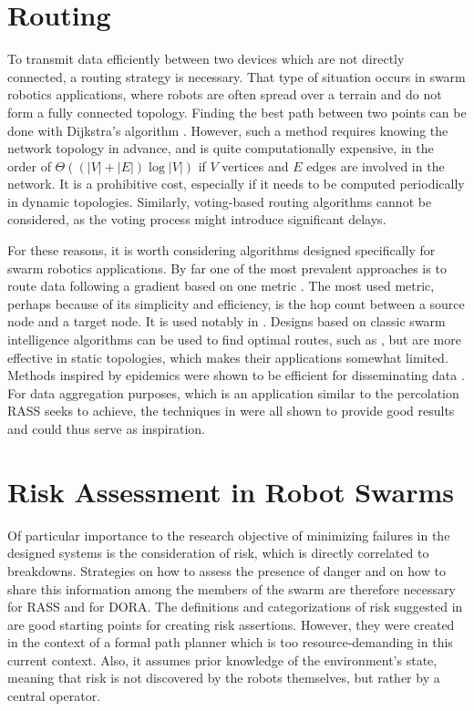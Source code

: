 \section{Routing}
To transmit data efficiently between two devices which are not directly connected, a routing strategy is necessary. That type of situation occurs in swarm robotics applications, where robots are often spread over a terrain and do not form a fully connected topology. Finding the best path between two points can be done with Dijkstra's algorithm \cite{dijkstra1959note}. However, such a method requires knowing the network topology in advance, and is quite computationally expensive, in the order of $\Theta((|V|+|E|)\log|V|)$ if $V$ vertices and $E$ edges are involved in the network. It is a prohibitive cost, especially if it needs to be computed periodically in dynamic topologies. Similarly, voting-based routing algorithms cannot be considered, as the voting process might introduce significant delays.

For these reasons, it is worth considering algorithms designed specifically for swarm robotics applications. By far one of the most prevalent approaches is to route data following a gradient based on one metric \cite{draves2004comparison,watteyne2009implementation}. The most used metric, perhaps because of its simplicity and efficiency, is the hop count between a source node and a target node. It is used notably in \cite{watteyne2009implementation,kuruvila2005hop,zhang2014efficient,al2019efficient}. Designs based on classic swarm intelligence algorithms can be used to find optimal routes, such as \cite{li2011slime,jiang2018toward,jiang2018effective,liao2008data,tolstaya2021learning}, but are more effective in static topologies, which makes their applications somewhat limited. Methods inspired by epidemics were shown to be efficient for disseminating data \cite{ganesan2002empirical,hui2004dynamic}. For data aggregation purposes, which is an application similar to the percolation \ac{RASS} seeks to achieve, the techniques in  \cite{jiang2018effective,liao2008data,dhand2016data} were all shown to provide good results and could thus serve as inspiration.

\section{Risk Assessment in Robot Swarms}
Of particular importance to the research objective of minimizing failures in the designed systems is the consideration of risk, which is directly correlated to breakdowns. Strategies on how to assess the presence of danger and on how to share this information among the members of the swarm are therefore necessary for \ac{RASS} and for \ac{DORA}.
The definitions and categorizations of risk suggested in \cite{xiao2020robot} are good starting points for creating risk assertions. However, they were created in the context of a formal path planner which is too resource-demanding in this current context. Also, it assumes prior knowledge of the environment's state, meaning that risk is not discovered by the robots themselves, but rather by a central operator. 


